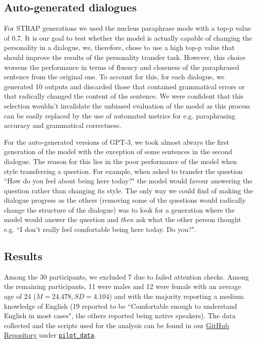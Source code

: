 \documentclass[nomenclature, english, biblatex]{kththesis}
\begin{document}
\subsection{Auto-generated dialogues}
For STRAP generations we used the nucleus paraphrase mode with a top-p value of 0.7. It is our goal to test whether the model is actually capable of changing the personality in a dialogue, we, therefore, chose to use a high top-p value that should improve the results of the personality transfer task. However, this choice worsens the performance in terms of fluency and closeness of the paraphrased sentence from the original one. To account for this, for each dialogue, we generated 10 outputs and discarded those that contained grammatical errors or that radically changed the content of the sentence. We were confident that this selection wouldn't invalidate the unbiased evaluation of the model as this process can be easily replaced by the use of automated metrics for e.g. paraphrasing accuracy and grammatical correctness.

For the auto-generated versions of GPT-3, we took almost always the first generation of the model with the exception of some sentences in the second dialogue. The reason for this lies in the poor performance of the model when style transferring a question. For example, when asked to transfer the question ``How do you feel about being here today?" the model would favour answering the question rather than changing its style. The only way we could find of making the dialogue progress as the others (removing some of the questions would radically change the structure of the dialogue) was to look for a generation where the model would answer the question and \textit{then} ask what the other person thought e.g. ``I don't really feel comfortable being here today. Do you?".
\subsection{Results}
Among the 30 participants, we excluded 7 due to failed attention checks. Among the remaining participants, 11 were males and 12 were female with an average age of 24 ($M=24.478, SD=4.104$) and with the majority reporting a medium knowledge of English (19 reported to be ``Comfortable enough to understand English in most cases", the others reported being native speakers). The data collected and the scripts used for the analysis can be found in our \href{https://github.com/alessioGalatolo/Furhat-Personality-and-Emotions/}{GitHub Repository} under \href{https://github.com/alessioGalatolo/Furhat-Personality-and-Emotions/tree/main/pilot_data}{\texttt{pilot_data}}.
\end{document}
